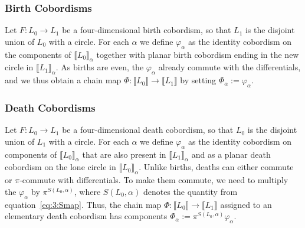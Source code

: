 \documentclass[12pt]{amsart}
\theoremstyle{definition}
\theoremstyle{plain}
\begin{document}
\subsubsection{Birth Cobordisms}

Let $F\colon L_0\rightarrow L_1$ be a four-dimensional birth cobordism, so that $L_1$ is the disjoint union of $L_0$ with a circle.  For each $\alpha$ we define $\varphi_\alpha$ as the identity cobordism on the components of $\llbracket L_0\rrbracket_\alpha$ together with planar birth cobordism ending in the new circle in $\llbracket L_1\rrbracket_\alpha$.  As births are even, the $\varphi_\alpha$ already commute with the differentials,
and we thus obtain a chain map $\Phi\colon\llbracket L_0\rrbracket\rightarrow\llbracket L_1\rrbracket$ by setting $\Phi_\alpha:=\varphi_\alpha$.

\subsubsection{Death Cobordisms}

 Let $F\colon L_0\rightarrow L_1$ be a four-dimensional death cobordism, so that $L_0$ is the disjoint union of $L_1$ with a circle.  For each $\alpha$ we define $\varphi_\alpha$ as the identity cobordism on components of $\llbracket L_0\rrbracket_\alpha$ that are also present in $\llbracket L_1\rrbracket_\alpha$ and as a planar death cobordism on the lone circle in $\llbracket L_0\rrbracket_\alpha$.  Unlike births, deaths can either commute or $\pi$-commute with differentials. To make them commute, we need to multiply the $\varphi_\alpha$ by $\pi^{S(L_0,\alpha)}$, where
 $S(L_0,\alpha)$ denotes the quantity from equation~\eqref{eq:3:Smap}.
 Thus, the chain map $\Phi\colon\llbracket L_0\rrbracket\rightarrow\llbracket L_1\rrbracket$ assigned to an elementary death cobordism has
 components $\Phi_\alpha:=\pi^{S(L_0,\alpha)}\varphi_\alpha$.
\end{document}
